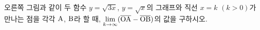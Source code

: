 \noindent\begin{minipage}[t]{0.58\linewidth}\vspace{0pt}\raggedright 오른쪽 그림과 같이 두 함수 $y=\sqrt{3x}$, $y=\sqrt{x}$의 그래프와 직선 $x=k$ $(k>0)$가 만나는 점을 각각 $\mathrm{A}$, $\mathrm{B}$라 할 때, $\displaystyle\lim_{k\to\infty}(\overline{\mathrm{OA}}-\overline{\mathrm{OB}})$의 값을 구하시오. \end{minipage}\hfill\begin{minipage}[t]{0.4\linewidth}\vspace{0pt}\centering \resizebox{\ifdim\width>\linewidth\linewidth\else\width\fi}{!}{}\end{minipage}\par
